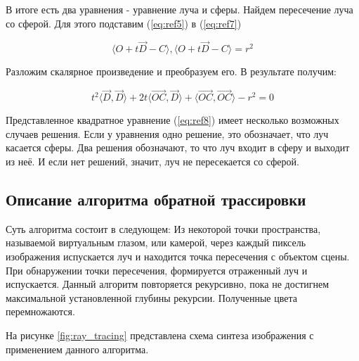             В итоге есть два уравнения - уравнение луча и сферы. Найдем пересечение луча со сферой. Для этого подставим (\ref{eq:ref5}) в (\ref{eq:ref7})
            
            \begin{equation}
            	\langle O + t\overrightarrow{D} - C \rangle, \langle O + t\overrightarrow{D} - C\rangle = r^2
            \end{equation}
            
            Разложим скалярное произведение и преобразуем его. В результате получим:
            
            \begin{equation}
            	t^2 \langle \overrightarrow{D}, \overrightarrow{D} \rangle + 2t \langle \overrightarrow{OC}, \overrightarrow{D} \rangle + \langle \overrightarrow{OC}, \overrightarrow{OC} \rangle -r^2 = 0
            	\label{eq:ref8}
            \end{equation}
            
            Представленное квадратное уравнение (\ref{eq:ref8}) имеет несколько возможных случаев решения. Если у уравнения одно решение, это обозначает, что луч касается сферы. Два решения обозначают, то что луч входит в сферу и выходит из неё. И если нет решений, значит, луч не пересекается со сферой.

        \subsection{Описание алгоритма обратной трассировки}
        
            Суть алгоритма состоит в следующем: Из некоторой точки пространства, называемой виртуальным глазом, или камерой, через каждый пиксель изображения испускается луч и находится точка пересечения с объектом сцены. При обнаружении точки пересечения, формируется отраженный луч и испускается. Данный алгоритм повторяется рекурсивно, пока не достигнем максимальной установленной глубины рекурсии. Полученные цвета перемножаются.

            На рисунке \ref{fig:ray_tracing} представлена схема синтеза изображения с применением данного алгоритма.

